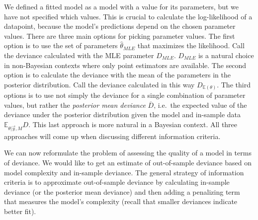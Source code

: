 \documentclass[a4paper,12pt,twoside]{article}
\begin{document}
We defined a fitted model as a model with a value for its parameters, but we have not specified which values. This is crucial to calculate the log-likelihood of a datapoint, because the model's predictions depend on the chosen parameter values. There are three main options for picking parameter values. The first option is to use the set of parameters $\hat{\theta}_{MLE}$ that maximizes the likelihood. Call the deviance calculated with the MLE parameter $D_{MLE}$. $D_{MLE}$ is a natural choice in non-Bayesian contexts where only point estimators are available. The second option is to calculate the deviance with the mean of the parameters in the posterior distribution. Call the deviance calculated in this way $D_{\mathbb{E}(\theta)}$. The third options is to use not simply the deviance for a single combination of parameter values, but rather the \textit{posterior mean deviance} $\overline{D}$, i.e.\ the expected value of the deviance under the posterior distribution given the model and in-sample data $\mathbb{E}_{\theta | \vec{y}, M} D $. This last approach is more natural in a Bayesian context. All three approaches will come up when discussing different information criteria.

We can now reformulate the problem of assessing the quality of a model in terms of deviance. We would like to get an estimate of out-of-sample deviance based on model complexity and in-sample deviance. The general strategy of information criteria is to approximate out-of-sample deviance by calculating in-sample deviance (or the posterior mean deviance) and then adding a penalizing term that measures the model's complexity (recall that smaller deviances indicate better fit).
\end{document}
